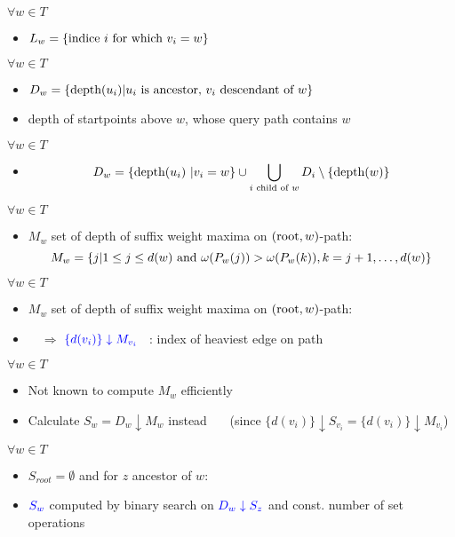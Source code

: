 \documentclass[18pt]{beamer}
\begin{document}
\begin{frame}
\begin{overprint}
\begin{itemize}
            	\end{itemize}
            	$\forall w \in T$
            	\begin{itemize}
            	\item $L_w = \{\textup{indice } i \textup{ for which } v_i = w\}$
            	\end{itemize}
           		 $\forall w \in T$
           		 \begin{itemize}
            		\item $D_w = \{\textup{depth}(u_i) | u_i \textup{ is ancestor, } v_i \textup{ descendant of } w\}$
            		\item {\color{blue} depth} of startpoints above $w$, whose query path contains $w$
            	\end{itemize}
                $\forall w \in T$
                \begin{itemize}
                	\item \[D_w = \{\textup{depth}(u_i) \ | v_i = w\} \cup \bigcup_{i \textup{ child of } w } D_i \setminus \{\textup{depth}(w)\}\]
                \end{itemize}
            	$\forall w \in T$
            	\begin{itemize}
           		\item $M_w$ set of depth of suffix weight maxima on $(\textup{root},w)$-path:
           		\[
           		M_w = \{j | 1 \le j \le d(w) \textup{ and } \omega(P_w(j)) > \omega(P_w(k)), k = j+1, \dots, d(w)\}
           		\]
           		\end{itemize}
           	    $\forall w \in T$
           	    \begin{itemize}
           	    	\item $M_w$ set of depth of suffix weight maxima on $(\textup{root},w)$-path:
           	    	\item [] \ \ $\Rightarrow$ $\color{blue}\{d(v_i)\} \downarrow M_{v_i}$ \ : index of heaviest edge on path
           	    \end{itemize}
                $\forall w \in T$
                \begin{itemize}
                	\item Not known to compute $M_w$ efficiently
                	\item Calculate $S_w = D_w \downarrow M_w$ instead \ \ \ ({\footnotesize since $\{d(v_i)\} \downarrow S_{v_i} = \{d(v{_i})\} \downarrow M_{v_i}$})
                \end{itemize}
            	$\forall w \in T$
            	\begin{itemize}
            		\item $S_{root} = \emptyset$ and for $z$ ancestor of $w$:
            		\item $\color{blue} S_w$ computed by binary search on $\color{blue} D_w \downarrow S_z$ and const. number of set operations
            	\end{itemize}
            \end{overprint}
		

\end{frame}
\end{document}
